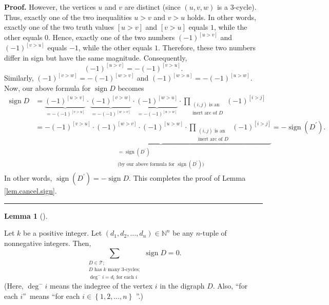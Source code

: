 \documentclass[numbers=enddot,12pt,final,onecolumn,notitlepage]{scrartcl}%
\numberwithin{exer}{subsection}
\theoremstyle{definition}
\newtheorem{lem}[theo]{Lemma}
\newenvironment{lemma}[1][]
{\begin{lem}[#1]\begin{leftbar}}
{\end{leftbar}\end{lem}}
\newenvironment{proof}[1][Proof]{\noindent\textbf{#1.} }{\ \rule{0.5em}{0.5em}}
\let\sumnonlimits\sum
\let\prodnonlimits\prod
\renewcommand{\sum}{\sumnonlimits\limits}
\renewcommand{\prod}{\prodnonlimits\limits}
\begin{document}
\begin{proof}
However, the vertices $u$ and $v$ are distinct (since $\left(  u,v,w\right)  $
is a $3$-cycle). Thus, exactly one of the two inequalities $u>v$ and $v>u$
holds. In other words, exactly one of the two truth values $\left[
u>v\right]  $ and $\left[  v>u\right]  $ equals $1$, while the other equals
$0$. Hence, exactly one of the two numbers $\left(  -1\right)  ^{\left[
u>v\right]  }$ and $\left(  -1\right)  ^{\left[  v>u\right]  }$ equals $-1$,
while the other equals $1$. Therefore, these two numbers differ in sign but
have the same magnitude. Consequently,%
\[
\left(  -1\right)  ^{\left[  u>v\right]  }=-\left(  -1\right)  ^{\left[
v>u\right]  }.
\]
Similarly, $\left(  -1\right)  ^{\left[  v>w\right]  }=-\left(  -1\right)
^{\left[  w>v\right]  }$ and $\left(  -1\right)  ^{\left[  w>u\right]
}=-\left(  -1\right)  ^{\left[  u>w\right]  }$. Now, our above formula for
$\operatorname*{sign}D$ becomes%
\begin{align*}
\operatorname*{sign}D &  =\underbrace{\left(  -1\right)  ^{\left[  u>v\right]
}}_{=-\left(  -1\right)  ^{\left[  v>u\right]  }}\cdot\underbrace{\left(
-1\right)  ^{\left[  v>w\right]  }}_{=-\left(  -1\right)  ^{\left[
w>v\right]  }}\cdot\underbrace{\left(  -1\right)  ^{\left[  w>u\right]  }%
}_{=-\left(  -1\right)  ^{\left[  u>w\right]  }}\cdot\prod_{\substack{\left(
i,j\right)  \text{ is an}\\\text{inert arc of }D}}\left(  -1\right)  ^{\left[
i>j\right]  }\\
&  =-\underbrace{\left(  -1\right)  ^{\left[  v>u\right]  }\cdot\left(
-1\right)  ^{\left[  w>v\right]  }\cdot\left(  -1\right)  ^{\left[
u>w\right]  }\cdot\prod_{\substack{\left(  i,j\right)  \text{ is
an}\\\text{inert arc of }D}}\left(  -1\right)  ^{\left[  i>j\right]  }%
}_{\substack{=\operatorname*{sign}\left(  D^{\prime}\right)  \\\text{(by our
above formula for }\operatorname*{sign}\left(  D^{\prime}\right)  \text{)}%
}}=-\operatorname*{sign}\left(  D^{\prime}\right)  .
\end{align*}
In other words, $\operatorname*{sign}\left(  D^{\prime}\right)
=-\operatorname*{sign}D$. This completes the proof of Lemma
\ref{lem.cancel.sign}.
\end{proof}

\begin{lemma}
\label{lem.cancel.1}Let $k$ be a positive integer. Let $\left(  d_{1}%
,d_{2},\ldots,d_{n}\right)  \in\mathbb{N}^{n}$ be any $n$-tuple of nonnegative
integers. Then,%
\[
\sum_{\substack{D\in\mathcal{T};\\D\text{ has }k\text{ many }3\text{-cycles}%
;\\\deg^{-}i=d_{i}\text{ for each }i}}\operatorname*{sign}D=0.
\]
(Here, $\deg^{-}i$ means the indegree of the vertex $i$ in the digraph $D$.
Also, \textquotedblleft for each $i$\textquotedblright\ means
\textquotedblleft for each $i\in\left\{  1,2,\ldots,n\right\}  $%
\textquotedblright.)
\end{lemma}
\end{document}
